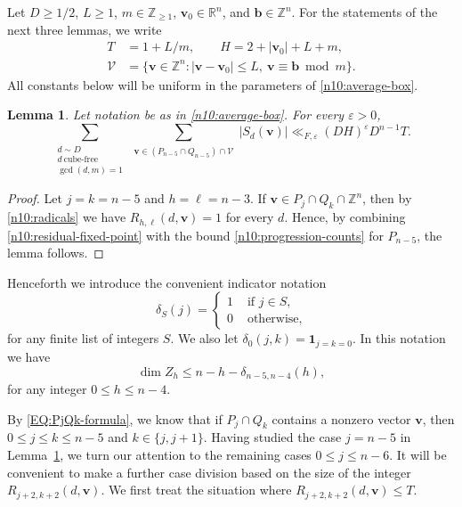 \documentclass[a4paper,11pt, twoside,reqno]{amsart}
\theoremstyle{plain}
\newtheorem{lemma}[thm]{Lemma}
\theoremstyle{definition}
\theoremstyle{remark}
\newcommand{\bfb}{\bm{b}}
\newcommand{\bfv}{\bm{v}}
\newcommand{\ZZ}{\mathbb{Z}}
\newcommand{\RR}{\mathbb{R}}
\newcommand{\ve}{\varepsilon}
\renewcommand{\le}{\leqslant}
\renewcommand{\leq}{\leqslant}
\renewcommand{\ge}{\geqslant}
\numberwithin{equation}{section}
\begin{document}
Let $D\ge 1/2$, $L\ge1$, $m\in\ZZ_{\ge1}$, $\bfv_0\in\RR^n$, and $\bfb\in\ZZ^n$.
For the statements of the next three lemmas, we write
\begin{equation}\label{n10:average-box}
\begin{split}
T&=1+L/m,\qquad H=2+|\bfv_0|+L+m,\\
\mathcal V&=\{\bfv\in\ZZ^n:|\bfv-\bfv_0|\le L,
\ \bfv\equiv\bfb\bmod m\}.
\end{split}
\end{equation}
All constants below will be uniform in the parameters of
\eqref{n10:average-box}.

\begin{lemma}
\label{LEM:n5divisorbound}
Let notation be as in \eqref{n10:average-box}.
For every $\varepsilon>0$,
\[
\sum_{\substack{
d\sim D\\d\ \mathrm{cube\text{-}free}\\
\gcd(d,m)=1}}
\sum_{\substack{
\bfv\in(P_{n-5}\cap Q_{n-5})\cap\mathcal V}}
|S_d(\bfv)|\ll_{F,\ve} (DH)^\ve D^{n-1}T.
\]
\end{lemma}

\begin{proof}
Let $j=k=n-5$ and $h=\ell=n-3$.
If $\bfv\in P_j\cap Q_k\cap \ZZ^n$,
then by \eqref{n10:radicals} we have $R_{h,\ell}(d,\bfv)=1$ for every $d$.
Hence, by combining \eqref{n10:residual-fixed-point}
with the bound \eqref{n10:progression-counts} for $P_{n-5}$,
the lemma follows. 
\end{proof}

Henceforth we introduce the convenient indicator notation
\[
\delta_S(j)=
\begin{cases}
1&\text{ if $j\in S$},\\
0&\text{ otherwise},
\end{cases}
\]
for any finite list of integers $S$.
We also let $\delta_0(j,k)=\bm1_{j=k=0}$.
In this notation we have 
\begin{equation}\label{eq:silver}
\dim Z_{h}\leq n-h-\delta_{n-5,n-4}(h),
\end{equation}
for any integer $0\leq h\leq n-4$.


By \eqref{EQ:PjQk-formula},
we know that if $P_j\cap Q_k$ contains a nonzero vector $\bfv$, then
$0\le j\le k\le n-5$ and $k\in \{j,j+1\}$.
Having studied the case $j=n-5$ in Lemma~\ref{LEM:n5divisorbound},
we turn our attention to the remaining cases $0\le j\le n-6$.
It will be convenient to make a further case division based on the size of
the integer $R_{j+2,k+2}(d,\bfv)$.
We first treat the situation where $R_{j+2,k+2}(d,\bfv)\le T$.
\end{document}

